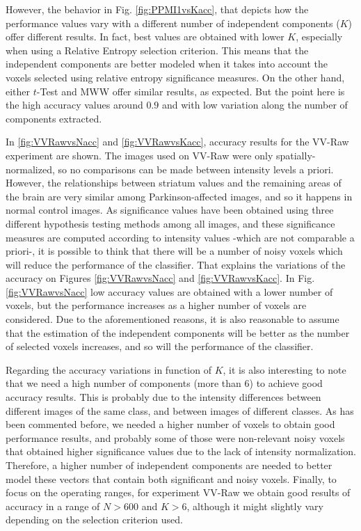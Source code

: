 	However, the behavior in Fig. \ref{fig:PPMI1vsKacc}, that depicts how the performance values vary with a different number of independent components ($K$) offer different results. In fact, best values are obtained with lower $K$, especially when using a Relative Entropy selection criterion. This means that the independent components are better modeled when it takes into account the voxels selected using relative entropy significance measures. On the other hand, either $t$-Test and MWW offer similar results, as expected. But the point here is the high accuracy values around $0.9$ and with low variation along the number of components extracted. 
	
	In \ref{fig:VVRawvsNacc} and \ref{fig:VVRawvsKacc}, accuracy results for the VV-Raw experiment are shown. The images used on VV-Raw were only spatially-normalized, so no comparisons can be made between intensity levels a priori. However, the relationships between striatum values and the remaining areas of the brain are very similar among Parkinson-affected  images, and so it happens in normal control images.  As significance values have been obtained using three different hypothesis testing methods among all images, and these significance measures are computed according to intensity values -which are not comparable a priori-, it is possible to think that there will be a number of noisy voxels which will reduce the performance of the classifier. That explains the variations of the accuracy on Figures \ref{fig:VVRawvsNacc} and \ref{fig:VVRawvsKacc}. In Fig. \ref{fig:VVRawvsNacc} low accuracy values are obtained with a lower number of voxels, but the performance increases as a higher number of voxels are considered. Due to the aforementioned reasons, it is also reasonable to assume that the estimation of the independent components will be better as the number of selected voxels increases, and so will the performance of the classifier.
	
	Regarding the accuracy variations in function of $K$, it is also interesting to note that we need a high number of components (more than $6$) to achieve good accuracy results. This is probably due to the intensity differences between different images of the same class, and between images of different classes. As has been commented before, we needed a higher number of voxels to obtain good performance results, and probably some of those were non-relevant noisy voxels that obtained higher significance values due to the lack of intensity normalization. Therefore, a higher number of independent components are needed to better model these vectors that contain both significant and noisy voxels. Finally, to focus on the operating ranges, for experiment VV-Raw we obtain good results of accuracy in a range of $N > 600$ and $K>6$, although it might slightly vary depending on the selection criterion used.
	
